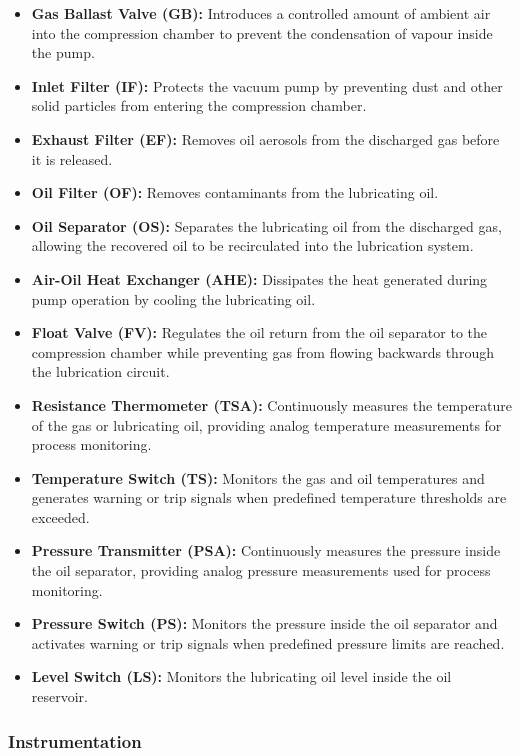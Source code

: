 \begin{itemize}
    \item \textbf{Gas Ballast Valve (GB):} Introduces a controlled amount of ambient air into the compression chamber to prevent the condensation of vapour inside 
    the pump.
    \item \textbf{Inlet Filter (IF):} Protects the vacuum pump by preventing dust and other solid particles from entering the compression chamber.
    \item \textbf{Exhaust Filter (EF):} Removes oil aerosols from the discharged gas before it is released.
    \item \textbf{Oil Filter (OF):} Removes contaminants from the lubricating oil.
    \item \textbf{Oil Separator (OS):} Separates the lubricating oil from the discharged gas, allowing the recovered oil to be recirculated into the lubrication system.
    \item \textbf{Air-Oil Heat Exchanger (AHE):} Dissipates the heat generated during pump operation by cooling the lubricating oil.
    \item \textbf{Float Valve (FV):} Regulates the oil return from the oil separator to the compression chamber while preventing gas from flowing backwards through 
    the lubrication circuit.
    \item \textbf{Resistance Thermometer (TSA):} Continuously measures the temperature of the gas or lubricating oil, providing analog temperature measurements for 
    process monitoring.
    \item \textbf{Temperature Switch (TS):} Monitors the gas and oil temperatures and generates warning or trip signals when predefined temperature thresholds are exceeded.
    \item \textbf{Pressure Transmitter (PSA):} Continuously measures the pressure inside the oil separator, providing analog pressure measurements used for process monitoring.
    \item \textbf{Pressure Switch (PS):} Monitors the pressure inside the oil separator and activates warning or trip signals when predefined pressure limits are reached.
    \item \textbf{Level Switch (LS):} Monitors the lubricating oil level inside the oil reservoir.
\end{itemize}

\subsubsection{Instrumentation} \label{sec:instrumentation}

